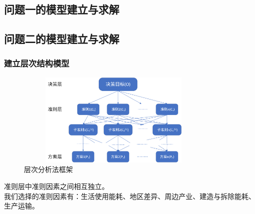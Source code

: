 \documentclass[a4paper, 12pt]{article}
\numberwithin{equation}{section}
\begin{document}
    {}


    {}
        \subsection{问题一的模型建立与求解}

        \subsection{问题二的模型建立与求解}
            \subsubsection{建立层次结构模型}
                \begin{figure}[h]
                    \centering
                    \includegraphics[height=4.5cm,width=9.5cm]{层次分析法框架.png}
                    \caption{层次分析法框架}
                \end{figure}
                准则层中准则因素之间相互独立。 \\
                我们选择的准则因素有：生活使用能耗、地区差异、周边产业、建造与拆除能耗、生产运输。
\end{document}
